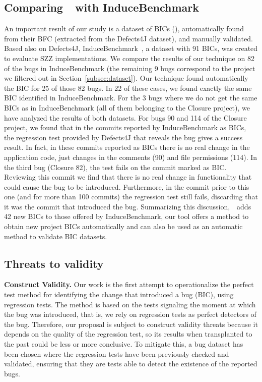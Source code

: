 \subsection{Comparing~\datasetName~with InduceBenchmark}
\label{sec:induce-benchmark}
An important result of our study is a dataset of BICs (\datasetName), automatically found from their BFC (extracted from the Defects4J dataset), and manually validated. 
Based also on Defects4J, InduceBenchmark~\cite{wen2019exploring}, a dataset with 91 BICs, was created to evaluate SZZ implementations. 
We compare the results of our technique on 82 of the bugs in InduceBenchmark (the remaining 9 bugs correspond to the project we filtered out in Section~\ref{subsec:dataset}). 
Our technique found automatically the BIC for 25 of those 82 bugs. In 22 of these cases, we found exactly the same BIC identified in InduceBenchmark.
For the 3 bugs where we do not get the same BICs as in InduceBenchmark (all of them belonging to the Closure project), we have analyzed the results of both datasets.
For bugs 90 and 114 of the Closure project, we found that in the commits reported by InduceBenchmark as BICs, the regression test provided by Defects4J that reveals the bug gives a success result. In fact, in these commits reported as BICs there is no real change in the application code, just changes in the comments (90) and file permissions (114).
In the third bug (Closure 82), the test fails on the commit marked as BIC. Reviewing this commit we find that there is no real change in functionality that could cause the bug to be introduced. Furthermore, in the commit prior to this one (and for more than 100 commits) the regression test still fails, discarding that it was the commit that introduced the bug. 
Summarizing this discussion,~\datasetName~adds 42 new BICs to those offered by InduceBenchmark, our tool offers a method to obtain new project BICs automatically and can also be used as an automatic method to validate BIC datasets.

\subsection{Threats to validity}
\label{sec:threats}

\textbf{Construct Validity.}
Our work is the first attempt to operationalize the perfect test method for identifying the change that introduced a bug (BIC), using regression tests. 
The method is based on the tests signaling the moment at which the bug was introduced, that is, we rely on regression tests as perfect detectors of the bug. 
Therefore, our proposal is subject to construct validity threats because it depends on the quality of the regression test, so its results when transplanted to the past could be less or more conclusive. 
To mitigate this, a bug dataset has been chosen where the regression tests have been previously checked and validated, ensuring that they are tests able to detect the existence of the reported bugs.

